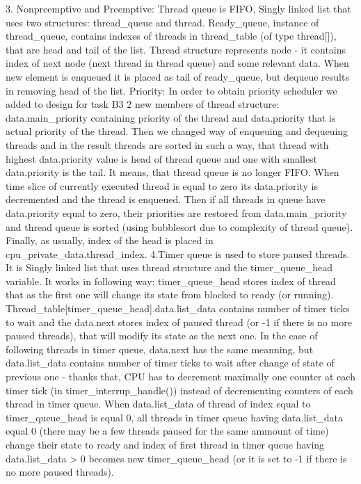 3.
Nonpreemptive and Preemptive:
Thread queue is FIFO, Singly linked list that uses two structures: thread_queue and thread. Ready_queue, instance of thread_queue, contains indexes of threads in thread_table (of type thread[]), that are head and tail of the list. Thread structure represents node - it contains index of next node (next thread in thread queue) and some relevant data. When new element is enqueued it is placed as tail of ready_queue, but dequeue results in removing head of the list.
Priority:
In order to obtain priority scheduler we added to design for task B3 2 new members of thread structure: data.main_priority containing priority of the thread and data.priority that is actual priority of the thread. Then we changed way of enqueuing and dequeuing threads and in the result threads are sorted in such a way, that thread with highest data.priority value is head of thread queue and one with smallest data.priority is the tail. It means, that thread queue is no longer FIFO. 
When time slice of currently executed thread is equal to zero its data.priority is decremented and the thread is enqueued. Then if all threads in queue have data.priority equal to zero, their priorities are restored from data.main_priority and thread queue is sorted (using bubblesort due to complexity of thread queue). Finally, as usually, index of the head is placed in cpu_private_data.thread_index.
4.Timer queue is used to store paused threads. It is Singly linked list that uses thread structure and the timer_queue_head variable. It works in following way: timer_queue_head stores index of thread that as the first one will change its state from blocked to ready (or running). Thread_table[timer_queue_head].data.list_data contains number of timer ticks to wait and the data.next stores index of paused thread (or -1 if there is no more paused threads), that will modify its state as the next one. In the case of following threads in timer queue, data.next has the same meanning, but data.list_data contains number of timer ticks to wait after change of state of previous one - thanks that, CPU has to decrement maximally one counter at each timer tick (in timer_interrup_handle()) instead of decrementing counters of each thread in timer queue. When data.list_data of thread of index equal to timer_queue_head is equal 0, all threads in timer queue having data.list_data equal 0 (there may be a few threads paused for the same ammount of time) change their state to ready and index of first thread in timer queue having data.list_data > 0 becomes new timer_queue_head (or it is set to -1 if there is no more paused threads).
